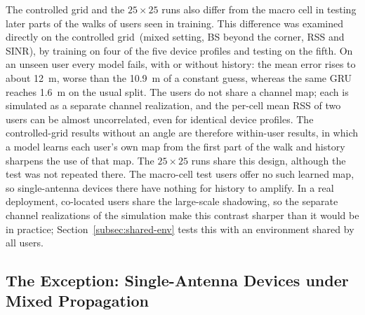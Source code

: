 The controlled grid and the $25\times25$ runs also differ from the macro cell in testing later parts of the walks of users seen in training. This difference was examined directly on the controlled grid~(mixed setting, BS beyond the corner, RSS and SINR), by training on four of the five device profiles and testing on the fifth. On an unseen user every model fails, with or without history: the mean error rises to about \SI{12}{\meter}, worse than the \SI{10.9}{\meter} of a constant guess, whereas the same GRU reaches \SI{1.6}{\meter} on the usual split. The users do not share a channel map; each is simulated as a separate channel realization, and the per-cell mean RSS of two users can be almost uncorrelated, even for identical device profiles. The controlled-grid results without an angle are therefore within-user results, in which a model learns each user's own map from the first part of the walk and history sharpens the use of that map. The $25\times25$ runs share this design, although the test was not repeated there. The macro-cell test users offer no such learned map, so single-antenna devices there have nothing for history to amplify. In a real deployment, co-located users share the large-scale shadowing, so the separate channel realizations of the simulation make this contrast sharper than it would be in practice; Section~\ref{subsec:shared-env} tests this with an environment shared by all users.

\subsection{The Exception: Single-Antenna Devices under Mixed Propagation}
\label{subsec:mixed-single}


